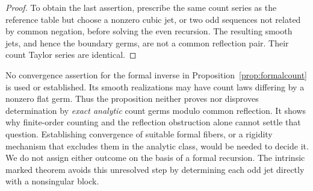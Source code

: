 \begin{proof}
To obtain the last assertion, prescribe the same count series as the
reference table but choose a nonzero cubic jet, or two odd sequences
not related by common negation, before solving the even recursion.
The resulting smooth jets, and hence the boundary germs, are not a
common reflection pair. Their count Taylor series are identical.
\end{proof}

\begin{remark}\label{rem:analyticcount}
No convergence assertion for the formal inverse in
Proposition~\ref{prop:formalcount} is used or established. Its smooth
realizations may have count laws differing by a nonzero flat germ.
Thus the proposition neither proves nor disproves determination by
\emph{exact analytic} count germs modulo common reflection. It shows why
finite-order counting and the reflection obstruction alone cannot settle
that question. Establishing convergence of suitable formal fibers, or a
rigidity mechanism that excludes them in the analytic class, would be
needed to decide it. We do not assign either outcome on the basis of a
formal recursion. The intrinsic marked theorem avoids this unresolved
step by determining each odd jet directly with a nonsingular block.
\end{remark}

